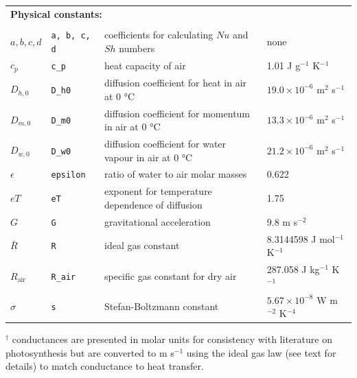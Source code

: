 \documentclass[11pt, oneside]{article}
\newcommand{\code}[1]{{\texttt{#1}}}
\begin{document}
\begin{table}[ht]
\begin{center}
{\begin{tabular}{llll}
  \\
  \multicolumn{4}{l}{\textbf{Physical constants:}} \\
  \\
  $a, b, c, d$     & \code{a, b, c, d} & coefficients for calculating $\mathit{Nu}$ and $\mathit{Sh}$ numbers & none \\
  $c_p$            & \code{c\_p}    & heat capacity of air & 1.01 J g$^{-1}$ K$^{-1}$ \\
  $D_{h,0}$        & \code{D\_h0}   & diffusion coefficient for heat in air at 0 °C & $19.0 \times 10^{-6}$ m$^2$ s$^{-1}$ \\
  $D_{m,0}$        & \code{D\_m0}   & diffusion coefficient for momentum in air at 0 °C & $13.3 \times 10^{-6}$ m$^2$ s$^{-1}$ \\
  $D_{w,0}$        & \code{D\_w0}   & diffusion coefficient for water vapour in air at 0 °C & $21.2 \times 10^{-6}$ m$^2$ s$^{-1}$ \\
  $\epsilon$       & \code{epsilon} & ratio of water to air molar masses & 0.622 \\
  $\mathit{eT}$    & \code{eT}      & exponent for temperature dependence of diffusion & 1.75 \\
  $G$              & \code{G}       & gravitational acceleration & 9.8 m s$^{-2}$ \\
  $\bar{R}$        & \code{R}       & ideal gas constant & 8.3144598 J mol$^{-1}$ K$^{-1}$ \\
  $R_\mathrm{air}$ & \code{R\_air}  & specific gas constant for dry air & 287.058 J kg$^{-1}$ K$^{-1}$ \\
  $\sigma$         & \code{s}       & Stefan-Boltzmann constant & $5.67 \times 10 ^ {-8}$ W m$^{-2}$ K$^{-4}$ \\

\bottomrule

\end{tabular}}
\end{center}
{$^\dagger$ conductances are presented in molar units for consistency with literature on photosynthesis but are converted to m s$^{-1}$ using the ideal gas law (see text for details) to match conductance to heat transfer.}

\label{table:table_input}
\end{table}
\end{document}
